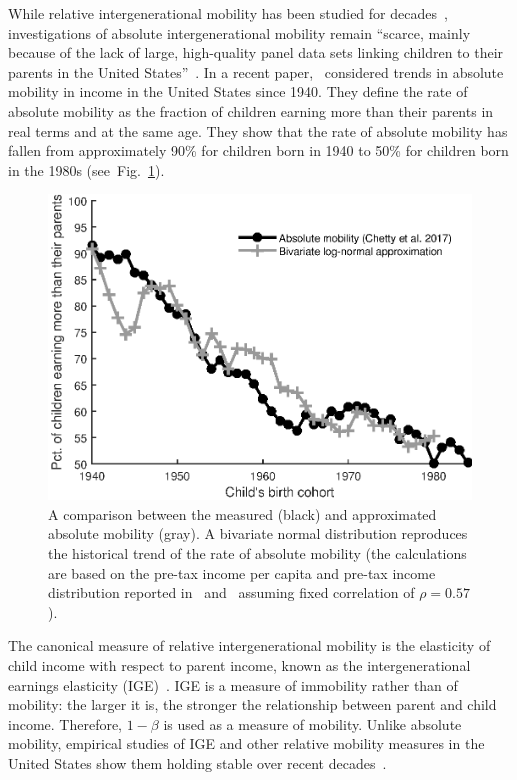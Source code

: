 \documentclass[12pt,times,letter]{article}
\newcommand{\flabel}[1]{\label{fig:#1}}
\newcommand{\fref}[1]{Fig.~\ref{fig:#1}}
\numberwithin{equation}{section}
\begin{document}
While relative intergenerational mobility has been studied for decades~\citep{mazumder2005fortunate,aaronson2008intergenerational,lee2009trends,hauser2010intergenerational,corak2013income,chetty2014united,berman2016understanding}, investigations of absolute intergenerational mobility remain ``scarce, mainly because of the lack of large, high-quality panel data sets linking children to their parents in the United States''~\citep[p.~398]{chetty2017fading}. In a recent paper,~\citet{chetty2017fading} considered trends in absolute mobility in income in the United States since 1940. They define the rate of absolute mobility as the fraction of children earning more than their parents in real terms and at the same age. They show that the rate of absolute mobility has fallen from approximately 90\% for children born in 1940 to 50\% for children born in the 1980s (see~\fref{trend}).

\begin{figure}[!htb]
\centering
\includegraphics[width=1.0\textwidth] {./figs/trend1.eps}
\caption{A comparison between the measured (black) and approximated absolute mobility (gray). A bivariate normal distribution reproduces the historical trend of the rate of absolute mobility (the calculations are based on the pre-tax income per capita and pre-tax income distribution reported in~\citet{PikettyZucman2014} and~\citet{WID2017} assuming fixed correlation of $\rho=0.57$).}
\flabel{trend}
\end{figure}

The canonical measure of relative intergenerational mobility is the elasticity of child income with respect to parent income, known as the intergenerational earnings elasticity (IGE)~\citep{mulligan1997parental,lee2009trends,chetty2014land}. IGE is a measure of immobility rather than of mobility: the larger it is, the stronger the relationship between parent and child income. Therefore, $1-\beta$ is used as a measure of mobility. Unlike absolute mobility, empirical studies of IGE and other relative mobility measures in the United States show them holding stable over recent decades~\citep{lee2009trends,hauser2010intergenerational,chetty2014land,chetty2014united}.
\end{document}
